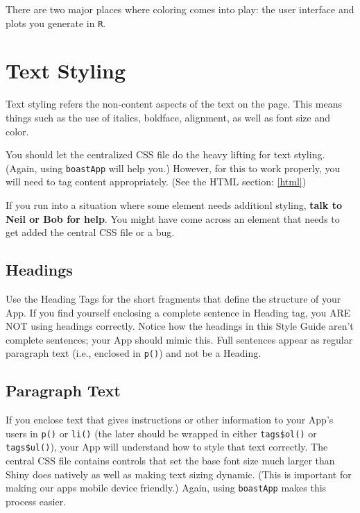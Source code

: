 \documentclass[
]{book}
\begin{document}
There are two major places where coloring comes into play: the user interface and plots you generate in \texttt{R}.

\hypertarget{styleText}{%
\section{Text Styling}\label{styleText}}

Text styling refers the non-content aspects of the text on the page. This means things such as the use of italics, boldface, alignment, as well as font size and color.

You should let the centralized CSS file do the heavy lifting for text styling. (Again, using \texttt{boastApp} will help you.) However, for this to work properly, you will need to tag content appropriately. (See the HTML section: \ref{html})

If you run into a situation where some element needs additionl styling, \textbf{talk to Neil or Bob for help}. You might have come across an element that needs to get added the central CSS file or a bug.

\hypertarget{headings}{%
\subsection{Headings}\label{headings}}

Use the Heading Tags for the short fragments that define the structure of your App. If you find yourself enclosing a complete sentence in Heading tag, you ARE NOT using headings correctly. Notice how the headings in this Style Guide aren't complete sentences; your App should mimic this. Full sentences appear as regular paragraph text (i.e., enclosed in \texttt{p()}) and not be a Heading.

\hypertarget{paragraph-text}{%
\subsection{Paragraph Text}\label{paragraph-text}}

If you enclose text that gives instructions or other information to your App's users in \texttt{p()} or \texttt{li()} (the later should be wrapped in either \texttt{tags\$ol()} or \texttt{tags\$ul()}), your App will understand how to style that text correctly. The central CSS file contains controls that set the base font size much larger than Shiny does natively as well as making text sizing dynamic. (This is important for making our apps mobile device friendly.) Again, using \texttt{boastApp} makes this process easier.
\end{document}
